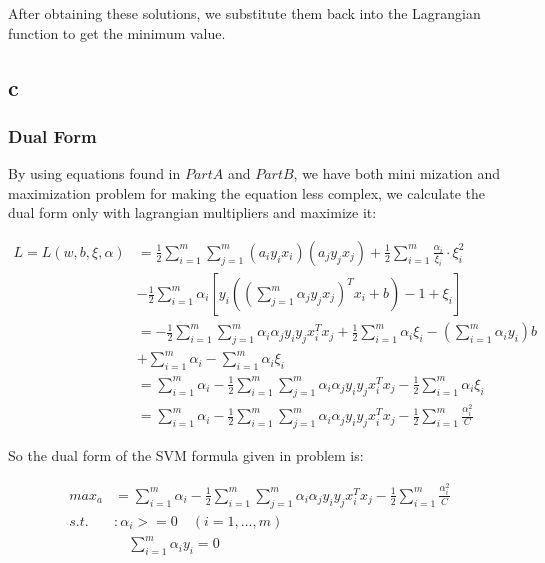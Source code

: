 \documentclass{article}
\begin{document}
\bigskip

After obtaining these solutions, we substitute them back into the Lagrangian function to get the minimum value.

\pagebreak

\subsection{c}
\subsubsection*{Dual Form}
By using equations found in $Part A$ and $Part B$, we have both mini
mization and maximization problem for making the equation less complex, we calculate the dual form only with lagrangian multipliers and maximize it:

\begin{align*}
  L = L(w, b, \xi, \alpha) &= \frac{1}{2} \sum_{i=1}^{m} \sum_{j=1}^{m} (a_i y_i x_i) (a_j y_j x_j) + \frac{1}{2} \sum_{i=1}^{m} \frac{\alpha_i}{\xi_i} \cdot \xi_i^2\\
  &- \frac{1}{2} \sum_{i=1}^{m} \alpha_i [y_i ((\sum_{j=1}^{m}\alpha_j y_j x_j)^T x_i + b) -1 + \xi_i] \\
  &= - \frac{1}{2} \sum_{i=1}^{m} \sum_{j=1}^{m} \alpha_i \alpha_j y_i y_j x_i^T x_j + \frac{1}{2} \sum_{i=1}^{m} \alpha_i \xi_i - (\sum_{i=1}^{m} \alpha_i y_i) b \\
  &+ \sum_{i=1}^{m} \alpha_i - \sum_{i=1}^{m} \alpha_i \xi_i \\
  &= \sum_{i=1}^{m} \alpha_i - \frac{1}{2} \sum_{i=1}^{m} \sum_{j=1}^{m} \alpha_i \alpha_j y_i y_j x_i^T x_j - \frac{1}{2} \sum_{i=1}^{m} \alpha_i \xi_i \\
  &= \sum_{i=1}^{m} \alpha_i - \frac{1}{2} \sum_{i=1}^{m} \sum_{j=1}^{m} \alpha_i \alpha_j y_i y_j x_i^T x_j - \frac{1}{2} \sum_{i=1}^{m} \frac{\alpha_i^2}{C}
\end{align*}

\bigskip 
\bigskip
\bigskip

So the dual form of the SVM formula given in problem is:

\begin{align*}
  max_a &= \sum_{i=1}^{m} \alpha_i - \frac{1}{2} \sum_{i=1}^{m} \sum_{j=1}^{m} \alpha_i \alpha_j y_i y_j x_i^T x_j - \frac{1}{2} \sum_{i=1}^{m} \frac{\alpha_i^2}{C} \\
  s.t. &: \alpha_i >= 0 \quad (i = 1, ..., m) \\
  &\quad \sum_{i=1}^{m} \alpha_i y_i = 0
\end{align*}
\end{document}
